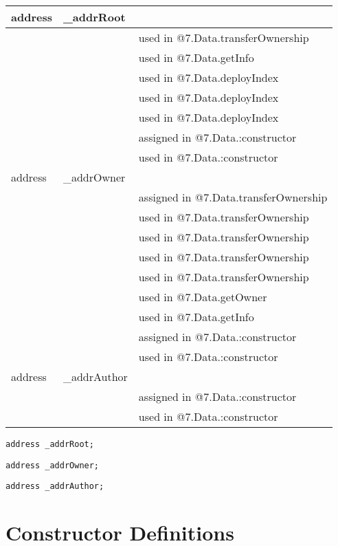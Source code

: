 \ifsoltables
\noindent\begin{tabular}{|l|l|p{5cm}|}\hline
address & \_{}addrRoot &  \\\hline
 & & used in @7.Data.transferOwnership\\\hline
 & & used in @7.Data.getInfo\\\hline
 & & used in @7.Data.deployIndex\\\hline
 & & used in @7.Data.deployIndex\\\hline
 & & used in @7.Data.deployIndex\\\hline
 & & assigned in @7.Data.:constructor\\\hline
 & & used in @7.Data.:constructor\\\hline
address & \_{}addrOwner &  \\\hline
 & & assigned in @7.Data.transferOwnership\\\hline
 & & used in @7.Data.transferOwnership\\\hline
 & & used in @7.Data.transferOwnership\\\hline
 & & used in @7.Data.transferOwnership\\\hline
 & & used in @7.Data.transferOwnership\\\hline
 & & used in @7.Data.getOwner\\\hline
 & & used in @7.Data.getInfo\\\hline
 & & assigned in @7.Data.:constructor\\\hline
 & & used in @7.Data.:constructor\\\hline
address & \_{}addrAuthor &  \\\hline
 & & assigned in @7.Data.:constructor\\\hline
 & & used in @7.Data.:constructor\\\hline
\end{tabular}
\fi


\begin{lstlisting}[firstnumber=14]
    address _addrRoot;
\end{lstlisting}

\begin{lstlisting}[firstnumber=15]
    address _addrOwner;
\end{lstlisting}

\begin{lstlisting}[firstnumber=16]
    address _addrAuthor;
\end{lstlisting}

\section{Constructor Definitions}


